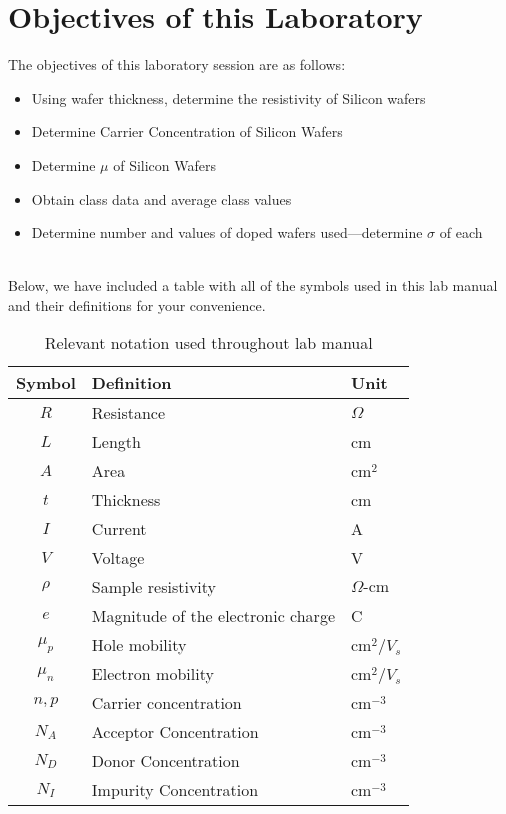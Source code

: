 \documentclass[12pt]{../manual}
\begin{document}
\section{Objectives of this Laboratory}
The objectives of this laboratory session are as follows:
\begin{itemize}
\item Using wafer thickness, determine the resistivity of Silicon wafers
\item Determine Carrier Concentration of Silicon Wafers
\item Determine $\mu$ of Silicon Wafers
\item Obtain class data and average class values
\item Determine number and values of doped wafers used---determine $\sigma$ of each
\end{itemize}
~\\ Below, we have included a table with all of the symbols used in this lab manual and their definitions for your convenience.
\def\arraystretch{1.5}
\begin{table}[ht!]
\caption{Relevant notation used throughout lab manual}
\centering
\begin{tabular}{|c|l|l|} \hline
Symbol 	& Definition							& Unit		\\ \hline
$R$ 	& Resistance 							& $\Omega$	\\ \hline
$L$		& Length								& cm		\\ \hline
$A$		& Area									& cm$^2$	\\ \hline
$t$		& Thickness								& cm		\\ \hline
$I$		& Current								& A			\\ \hline
$V$		& Voltage								& V			\\ \hline	
$\rho$ 	& Sample resistivity 					& $\Omega \mbox{-cm}$ \\ \hline
$e$ 	& Magnitude of the electronic charge 	& C 		\\ \hline
$\mu_p$ & Hole mobility 						& cm$^2 / V_s$ \\ \hline
$\mu_n$ & Electron mobility 					& cm$^2 / V_s$ \\ \hline
$n,p$ 	& Carrier concentration 				& cm$^{-3}$	\\ \hline
$N_A$	& Acceptor Concentration 				& cm$^{-3}$	\\ \hline
$N_D$ 	& Donor Concentration 					& cm$^{-3}$	\\ \hline
$N_I$	& Impurity Concentration 				& cm$^{-3}$	\\ \hline
\end{tabular}
\end{table}
\end{document}
